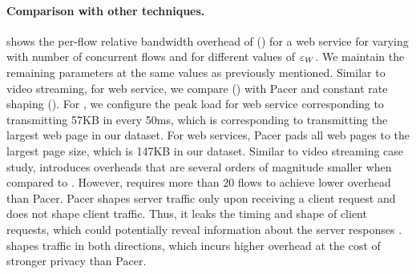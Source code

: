 \paragraph{Comparison with other techniques.}
 shows the per-flow relative bandwidth overhead of {\sys} ({\ns}) for a web service for varying with number of concurrent flows and for different values of $\varepsilon_{W}$.
We maintain the remaining parameters at the same values as previously mentioned.
Similar to video streaming, for web service, we compare {\sys} ({\ns}) with Pacer and constant rate shaping ({\constshape}).
For {\constshape}, we configure the peak load for web service corresponding to
transmitting 57KB in every 50ms, which is corresponding to transmitting the largest web page in our dataset.
For web services, Pacer pads all web pages to the largest page size, which is 147KB in our dataset.
Similar to video streaming case study, {\ns} introduces overheads that are several orders of magnitude smaller when compared to {\constshape}.
However,{\ns} requires more than 20 flows to achieve lower overhead than Pacer.
Pacer shapes server traffic only upon receiving a client request and does not
shape client traffic. 
Thus, it leaks the timing and shape of client requests, which could potentially reveal information about the server responses \cite{chen2010reality}.
{\sys} shapes traffic in both directions, which incurs higher overhead at the cost of stronger privacy than Pacer. 
